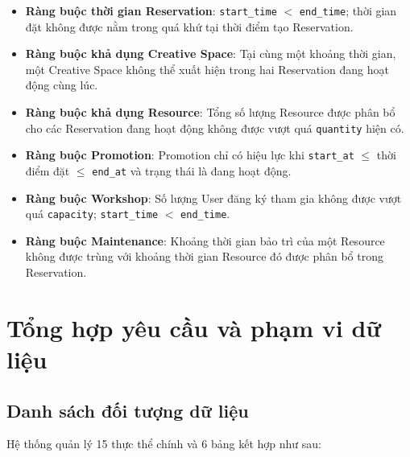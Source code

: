 \begin{itemize}
    \item \textbf{Ràng buộc thời gian Reservation}: \texttt{start\_time} $<$ \texttt{end\_time}; thời gian đặt không được nằm trong quá khứ tại thời điểm tạo Reservation.
    \item \textbf{Ràng buộc khả dụng Creative Space}: Tại cùng một khoảng thời gian, một Creative Space không thể xuất hiện trong hai Reservation đang hoạt động cùng lúc.
    \item \textbf{Ràng buộc khả dụng Resource}: Tổng số lượng Resource được phân bổ cho các Reservation đang hoạt động không được vượt quá \texttt{quantity} hiện có.
    \item \textbf{Ràng buộc Promotion}: Promotion chỉ có hiệu lực khi \texttt{start\_at} $\leq$ thời điểm đặt $\leq$ \texttt{end\_at} và trạng thái là đang hoạt động.
    \item \textbf{Ràng buộc Workshop}: Số lượng User đăng ký tham gia không được vượt quá \texttt{capacity}; \texttt{start\_time} $<$ \texttt{end\_time}.
    \item \textbf{Ràng buộc Maintenance}: Khoảng thời gian bảo trì của một Resource không được trùng với khoảng thời gian Resource đó được phân bổ trong Reservation.
\end{itemize}

\section{Tổng hợp yêu cầu và phạm vi dữ liệu}

\subsection{Danh sách đối tượng dữ liệu}

Hệ thống quản lý 15 thực thể chính và 6 bảng kết hợp như sau:

